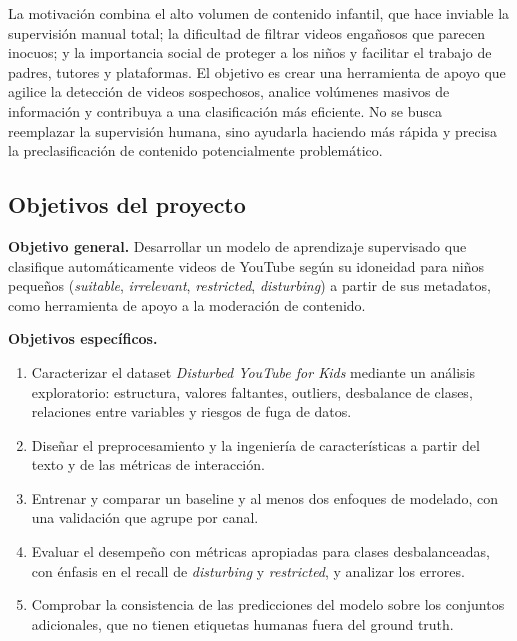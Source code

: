 \documentclass[conference]{IEEEtran}
\begin{document}
La motivación combina el alto volumen de contenido infantil, que hace inviable la supervisión manual total; la dificultad de filtrar videos engañosos que parecen inocuos; y la importancia social de proteger a los niños y facilitar el trabajo de padres, tutores y plataformas. El objetivo es crear una herramienta de apoyo que agilice la detección de videos sospechosos, analice volúmenes masivos de información y contribuya a una clasificación más eficiente. No se busca reemplazar la supervisión humana, sino ayudarla haciendo más rápida y precisa la preclasificación de contenido potencialmente problemático.

\subsection{Objetivos del proyecto}\label{sec:obj}
\textbf{Objetivo general.} Desarrollar un modelo de aprendizaje supervisado que clasifique automáticamente videos de YouTube según su idoneidad para niños pequeños (\textit{suitable}, \textit{irrelevant}, \textit{restricted}, \textit{disturbing}) a partir de sus metadatos, como herramienta de apoyo a la moderación de contenido.

\textbf{Objetivos específicos.}
\begin{enumerate}
\item Caracterizar el dataset \textit{Disturbed YouTube for Kids} mediante un análisis exploratorio: estructura, valores faltantes, outliers, desbalance de clases, relaciones entre variables y riesgos de fuga de datos.
\item Diseñar el preprocesamiento y la ingeniería de características a partir del texto y de las métricas de interacción.
\item Entrenar y comparar un baseline y al menos dos enfoques de modelado, con una validación que agrupe por canal.
\item Evaluar el desempeño con métricas apropiadas para clases desbalanceadas, con énfasis en el recall de \textit{disturbing} y \textit{restricted}, y analizar los errores.
\item Comprobar la consistencia de las predicciones del modelo sobre los conjuntos adicionales, que no tienen etiquetas humanas fuera del ground truth.
\end{enumerate}
\end{document}
